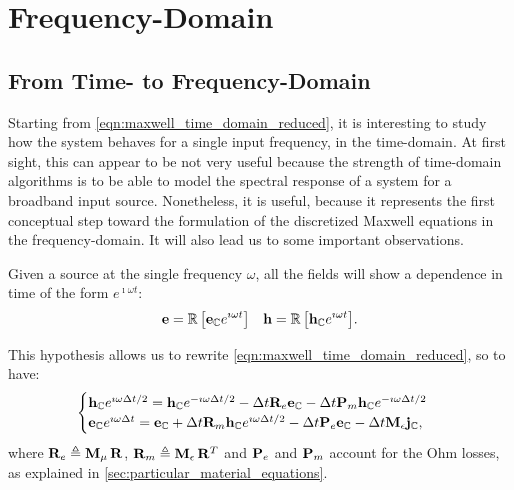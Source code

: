 \chapter{Frequency-Domain}

\section{From Time- to Frequency-Domain}

Starting from \eqref{eqn:maxwell_time_domain_reduced}, it is
interesting to study how the system behaves for a single input
frequency, in the time-domain.  At first sight, this can appear to be
not very useful because the strength of time-domain algorithms is to
be able to model the spectral response of a system for a broadband
input source. Nonetheless, it is useful, because it represents the
first conceptual step toward the formulation of the discretized
Maxwell equations in the frequency-domain. It will also lead us to
some important observations.

Given a source at the single frequency $\omega$, all the fields will show a
dependence in time of the form $e^{\imath \omega t}$:
\begin{align*}
  \mathbf{e} = {\mathbb{R}\left[\mathbf{e}_{\mathbb{C}} e^{\imath \omega t}\right]} &&
  \mathbf{h} = {\mathbb{R}\left[\mathbf{h}_{\mathbb{C}} e^{\imath \omega t}\right]} .
\end{align*}

This hypothesis allows us to rewrite
\eqref{eqn:maxwell_time_domain_reduced}, so to have:
\begin{equation} \label{eqn:maxwell_frequency_domain} \begin{cases}
    \mathbf{h}_{\mathbb{C}} e^{\imath \omega \Delta t/2} =
    \mathbf{h}_{\mathbb{C}} e^{-\imath \omega \Delta t/2} - \Delta t
    \mathbf{R}_e \mathbf{e}_{\mathbb{C}} - \Delta t \mathbf{P}_m
    \mathbf{h}_{\mathbb{C}} e^{-\imath \omega \Delta t/2} \\
    \mathbf{e}_{\mathbb{C}} e^{\imath \omega \Delta t} =
    \mathbf{e}_{\mathbb{C}} + \Delta t
    \mathbf{R}_m \mathbf{h}_{\mathbb{C}} e^{\imath \omega \Delta t/2} - \Delta t \mathbf{P}_e
    \mathbf{e}_{\mathbb{C}} - \Delta t \mathbf{M}_\epsilon \mathbf{j}_{\mathbb{C}} ,
\end{cases} \end{equation}
where $\mathbf{R}_e \triangleq {\mathbf{M}_\mu\,\mathbf{R}}$,
$\mathbf{R}_m \triangleq {\mathbf{M}_\epsilon\,{\mathbf{R}}^T}$
and $\mathbf{P}_e$ and $\mathbf{P}_m$ account for the Ohm losses, as explained
in \ref{sec:particular_material_equations}.


